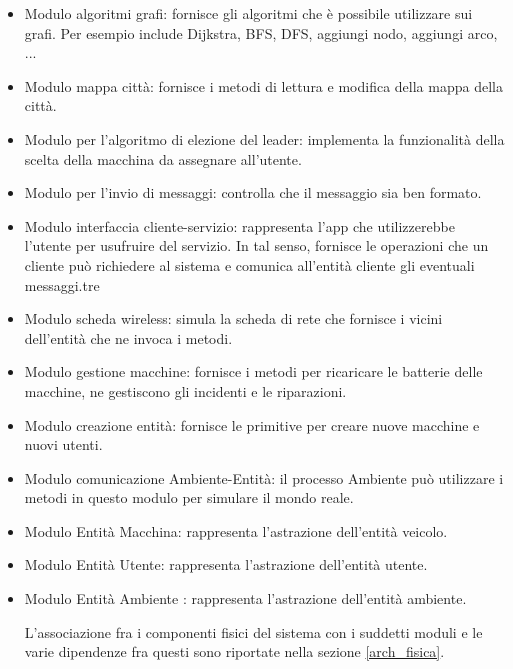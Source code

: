 \begin{itemize} \label{modules}

	\item Modulo algoritmi grafi: fornisce gli algoritmi che è possibile utilizzare sui grafi. Per esempio include Dijkstra, BFS, DFS, aggiungi nodo, aggiungi arco, ... 
	
	\item Modulo mappa città: fornisce i metodi di lettura e modifica della mappa della città.
	
	\item Modulo per l'algoritmo di elezione del leader: implementa la funzionalità della scelta della macchina da assegnare all'utente.
	
	\item Modulo per l'invio di messaggi: controlla che il messaggio sia ben formato.
	
	\item Modulo interfaccia cliente-servizio: rappresenta l'app che utilizzerebbe l'utente per usufruire del servizio. In tal senso, fornisce le operazioni che un cliente può richiedere al sistema e comunica all'entità cliente gli eventuali messaggi.tre
	
	\item Modulo scheda wireless: simula la scheda di rete che fornisce i vicini dell'entità che ne invoca i metodi.
	
	
	\item Modulo gestione macchine: fornisce i metodi per ricaricare le batterie delle macchine, ne gestiscono gli incidenti e le riparazioni.
	
	\item Modulo creazione entità: fornisce le primitive per creare nuove macchine e nuovi utenti.
	
	\item Modulo comunicazione Ambiente-Entità: il processo Ambiente può utilizzare i metodi in questo modulo per simulare il mondo reale.
	
	\item Modulo Entità Macchina: rappresenta l'astrazione dell'entità veicolo.
	
	\item Modulo Entità Utente: rappresenta l'astrazione dell'entità utente.
	
	\item Modulo Entità Ambiente : rappresenta l'astrazione dell'entità ambiente.

L'associazione fra i componenti fisici del sistema con i suddetti moduli e le varie dipendenze fra questi sono riportate nella sezione \ref{arch_fisica}.
\end{itemize}

